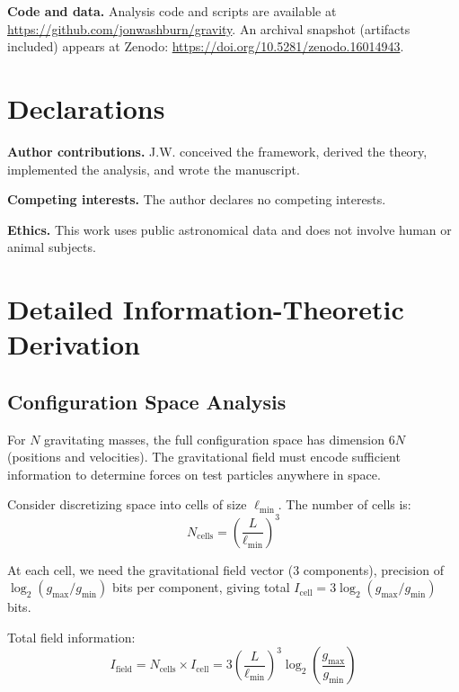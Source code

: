 \documentclass[twocolumn,prd,amsmath,amssymb,aps,superscriptaddress,nofootinbib]{revtex4-2}
\begin{document}
\noindent \textbf{Code and data.} Analysis code and scripts are available at \url{https://github.com/jonwashburn/gravity}. An archival snapshot (artifacts included) appears at Zenodo: \url{https://doi.org/10.5281/zenodo.16014943}.

\section*{Declarations}
\noindent \textbf{Author contributions.} J.W. conceived the framework, derived the theory, implemented the analysis, and wrote the manuscript.

\noindent \textbf{Competing interests.} The author declares no competing interests.

\noindent \textbf{Ethics.} This work uses public astronomical data and does not involve human or animal subjects.

\appendix

\section{Detailed Information-Theoretic Derivation}

\subsection{Configuration Space Analysis}

For $N$ gravitating masses, the full configuration space has dimension $6N$ (positions and velocities). The gravitational field must encode sufficient information to determine forces on test particles anywhere in space.

Consider discretizing space into cells of size $\ell_{\text{min}}$. The number of cells is:
\begin{equation}
N_{\text{cells}} = \left(\frac{L}{\ell_{\text{min}}}\right)^3
\end{equation}

At each cell, we need the gravitational field vector (3 components), precision of $\log_2(g_{\text{max}}/g_{\text{min}})$ bits per component, giving total $I_{\text{cell}} = 3 \log_2(g_{\text{max}}/g_{\text{min}})$ bits.

Total field information:
\begin{equation}
I_{\text{field}} = N_{\text{cells}} \times I_{\text{cell}} = 3\left(\frac{L}{\ell_{\text{min}}}\right)^3 \log_2\left(\frac{g_{\text{max}}}{g_{\text{min}}}\right)
\end{equation}
\end{document}
